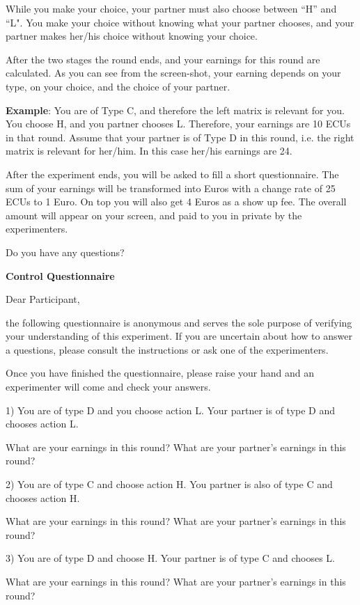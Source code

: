 \documentclass[12pt]{article}
\theoremstyle{break}
\begin{document}
While you make your choice, your partner must also choose between ``H'' and ``L". You make your choice without knowing what your partner chooses, and your partner makes her/his choice without knowing your choice. 

After the two stages the round ends, and your earnings for this round are calculated. As you can see from the screen-shot, your earning depends on your type, on your choice, and the choice of your partner. 

\textbf{Example}: You are of Type C, and therefore the left matrix is relevant for you. You choose H, and you partner chooses L. Therefore, your earnings are 10 ECUs in that round. Assume that your partner is of Type D in this round, i.e. the right matrix is relevant for her/him. In this case her/his earnings are 24. 

After the experiment ends, you will be asked to fill a short questionnaire. The sum of your earnings will be transformed into Euros with a change rate of 25 ECUs to 1 Euro. On top you will also get 4 Euros as a show up fee. The overall amount will appear on your screen, and paid to you in private by the experimenters. 

Do you have any questions? 

\textbf{Control Questionnaire}

Dear Participant,

the following questionnaire is anonymous and serves the sole purpose of verifying your understanding of this experiment. If you are uncertain about how to answer a questions, please consult the instructions or ask one of the experimenters.

Once you have finished the questionnaire, please raise your hand and an experimenter will come and check your answers.

1) You are of type D and you choose action L. Your partner is of type D and chooses action L.

What are your earnings in this round?
What are your partner’s earnings in this round?

2) You are of type C and choose action H. You partner is also of type C and chooses action H.

What are your earnings in this round?
What are your partner’s earnings in this round?


3) You are of type D and choose H. Your partner is of type C and chooses L.

What are your earnings in this round?
What are your partner’s earnings in this round?
\end{document}
